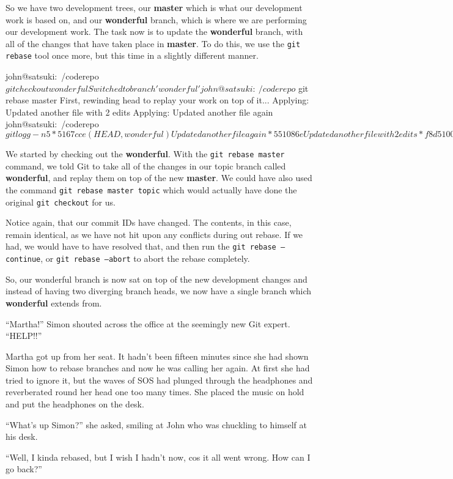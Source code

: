 So we have two development trees, our \textbf{master} which is what our development work is based on, and our \textbf{wonderful} branch, which is where we are performing our development work.  The task now is to update the \textbf{wonderful} branch, with all of the changes that have taken place in \textbf{master}.  To do this, we use the \texttt{git rebase} tool once more, but this time in a slightly different manner.

\begin{code}
john@satsuki:~/coderepo$ git checkout wonderful 
Switched to branch 'wonderful'
john@satsuki:~/coderepo$ git rebase master
First, rewinding head to replay your work on top of it...
Applying: Updated another file with 2 edits
Applying: Updated another file again
john@satsuki:~/coderepo$ git logg -n5
* 5167cce (HEAD, wonderful) Updated another file again
* 551086e Updated another file with 2 edits
* f8d5100 (master) Finished new dev
* 1968324 Start new dev
* 1c3206a Added a new file
john@satsuki:~/coderepo$ 
\end{code}

We started by checking out the \textbf{wonderful}.  With the \texttt{git rebase master} command, we told Git to take all of the changes in our topic branch called \textbf{wonderful}, and replay them on top of the new \textbf{master}.  We could have also used the command \texttt{git rebase master topic} which would actually have done the original \texttt{git checkout} for us.  

Notice again, that our commit IDs have changed.  The contents, in this case, remain identical, as we have not hit upon any conflicts during out rebase.  If we had, we would have to have resolved that, and then run the \texttt{git rebase --continue}, or \texttt{git rebase --abort} to abort the rebase completely.

So, our wonderful branch is now sat on top of the new development changes and instead of having two diverging branch heads, we now have a single branch which \textbf{wonderful} extends from.

\begin{trenches}
``Martha!''  Simon shouted across the office at the seemingly new Git expert.  ``HELP!!''

Martha got up from her seat.  It hadn't been fifteen minutes since she had shown Simon how to rebase branches and now he was calling her again.  At first she had tried to ignore it, but the waves of SOS had plunged through the headphones and reverberated round her head one too many times.  She placed the music on hold and put the headphones on the desk.

``What's up Simon?'' she asked, smiling at John who was chuckling to himself at his desk.

``Well, I kinda rebased, but I wish I hadn't now, cos it all went wrong.  How can I go back?''
\end{trenches}

